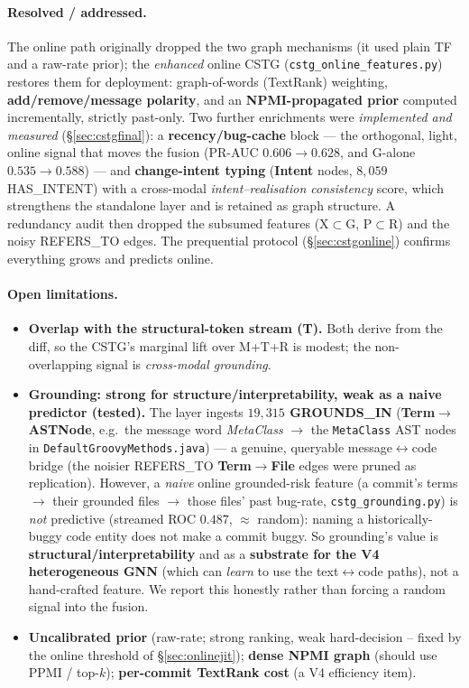 \documentclass[11pt,a4paper]{article}
\newcommand{\node}[1]{\textcolor{kgblue}{\textbf{#1}}}
\newcommand{\edge}[1]{\textsc{#1}}
\begin{document}
	\paragraph{Resolved / addressed.} The online path originally dropped the two graph
	mechanisms (it used plain TF and a raw-rate prior); the \emph{enhanced} online CSTG
	(\texttt{cstg\_online\_features.py}) restores them for deployment: graph-of-words
	(TextRank) weighting, \textbf{add/remove/message polarity}, and an \textbf{NPMI-propagated
	prior} computed incrementally, strictly past-only. Two further enrichments were
	\emph{implemented and measured} (\S\ref{sec:cstgfinal}): a \textbf{recency/bug-cache}
	block --- the orthogonal, light, online signal that moves the fusion (PR-AUC
	$0.606\!\rightarrow\!0.628$, and G-alone $0.535\!\rightarrow\!0.588$) --- and
	\textbf{change-intent typing} (\node{Intent} nodes, $8{,}059$ \edge{HAS\_INTENT})
	with a cross-modal \emph{intent--realisation consistency} score, which strengthens the
	standalone layer and is retained as graph structure. A redundancy audit then dropped
	the subsumed features (X$\subset$G, P$\subset$R) and the noisy \edge{REFERS\_TO}
	edges. The prequential protocol (\S\ref{sec:cstgonline}) confirms everything grows and
	predicts online.

	\paragraph{Open limitations.}
	\begin{itemize}[nosep]
		\item \textbf{Overlap with the structural-token stream (T).} Both derive from the
		diff, so the CSTG's marginal lift over M+T+R is modest; the non-overlapping signal
		is \emph{cross-modal grounding}.
		\item \textbf{Grounding: strong for structure/interpretability, weak as a naive
		predictor (tested).} The layer ingests \textbf{$19{,}315$ \edge{GROUNDS\_IN}}
		(\node{Term}$\rightarrow$\node{ASTNode}, e.g.\ the message word \emph{MetaClass}
		$\rightarrow$ the \texttt{MetaClass} AST nodes in \texttt{DefaultGroovyMethods.java})
		--- a genuine, queryable message$\leftrightarrow$code bridge (the noisier
		\edge{REFERS\_TO} \node{Term}$\rightarrow$\node{File} edges were pruned as
		replication). However, a \emph{naive} online grounded-risk feature (a commit's terms
		$\rightarrow$ their grounded files $\rightarrow$ those files' past bug-rate,
		\texttt{cstg\_grounding.py}) is \emph{not} predictive (streamed ROC $0.487$,
		$\approx$ random): naming a historically-buggy code entity does not make a commit
		buggy. So grounding's value is \textbf{structural/interpretability} and as a
		\textbf{substrate for the V4 heterogeneous GNN} (which can \emph{learn} to use the
		text$\leftrightarrow$code paths), not a hand-crafted feature. We report this
		honestly rather than forcing a random signal into the fusion.
		\item \textbf{Uncalibrated prior} (raw-rate; strong ranking, weak hard-decision --
		fixed by the online threshold of \S\ref{sec:onlinejit}); \textbf{dense NPMI graph}
		(should use PPMI / top-$k$); \textbf{per-commit TextRank cost} (a V4 efficiency item).
	\end{itemize}
\end{document}
